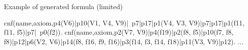 \begin{listing}[ht]
  \caption{Example of generated formula (limited)}
\begin{tptpcode}
% 
cnf(name,axiom,p4(V6)|p10(V1, V4, V9)|~p7|p17|p1(V4, V3, V9)|p7|p17|p1(f11, f11, f5)|p7|~p0(f2)).
cnf(name,axiom,p2(V7, V9)|p4(f19)|p2(f8, f5)|p10(f7, f8, f8)|p12|p6(V2, V6)|p14(f8, f16, f9, f16)|p3(f14, f3, f14, f18)|p11(V3, V9)|p12).
...
\end{tptpcode}
\end{listing}

